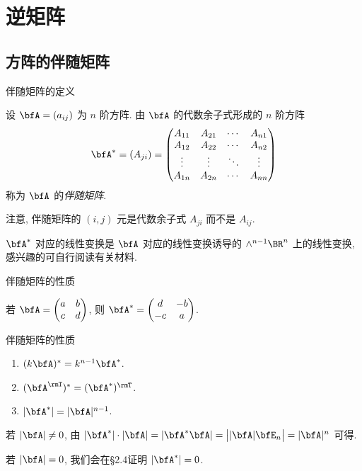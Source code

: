 \section{逆矩阵}

\subsection{方阵的伴随矩阵}

\begin{frame}{伴随矩阵的定义}
	\onslide<+->
	\begin{definition}
		设 $\bfA=(a_{ij})$ 为 $n$ 阶方阵.
		由 $\bfA$ 的代数余子式形成的 $n$ 阶方阵
		\[\bfA^*=(A_{ji})=\begin{pmatrix}
			A_{11}&A_{21}&\cdots&A_{n1}\\
			A_{12}&A_{22}&\cdots&A_{n2}\\
			\vdots&\vdots&\ddots&\vdots\\
			A_{1n}&A_{2n}&\cdots&A_{nn}
		\end{pmatrix}\]
		称为 $\bfA$ 的\emph{伴随矩阵}.
	\end{definition}
	\onslide<+->
	注意, 伴随矩阵的 $(i,j)$ 元是代数余子式 \alert{$A_{ji}$ 而不是 $A_{ij}$}.

	\onslide<+->
	$\bfA^*$ 对应的线性变换是 $\bfA$ 对应的线性变换诱导的 $\wedge^{n-1}\BR^n$ 上的线性变换, 感兴趣的可自行阅读有关材料.
\end{frame}


\begin{frame}{伴随矩阵的性质}
	\onslide<+->
	\begin{example}
		若 $\bfA=\begin{pmatrix}
			a&b\\c&d
		\end{pmatrix}$, 则 $\bfA^*=\begin{pmatrix}
			d&-b\\-c&a
		\end{pmatrix}$.
	\end{example}
	\onslide<+->
	\begin{second}{伴随矩阵的性质}
		\begin{enumerate}
			\item $(k\bfA)^*=k^{n-1}\bfA^*$.
			\item $(\bfA^\rmT)^*=(\bfA^*)^\rmT$.
			\item \alert{$|\bfA^*|=|\bfA|^{n-1}$}.
		\end{enumerate}
	\end{second}
	\onslide<+->
	若 $|\bfA|\neq0$, 由 $|\bfA^*|\cdot|\bfA|=|\bfA^*\bfA|=\bigl||\bfA|\bfE_n\bigr|=|\bfA|^n$ 可得.

	\onslide<+->
	若 $|\bfA|=0$, 我们会在\S2.4证明 $|\bfA^*|=0$.
\end{frame}


